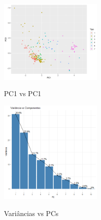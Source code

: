 \documentclass[conference]{IEEEtran}
\begin{document}
\begin{figure}[h]
\caption{PC1 vs PC1}
\centering %
\includegraphics[width=5cm]{images/pt4/pc1vspc1.png} %
\label{figura:histogramaal}
\end{figure}

\begin{figure}[h]
\caption{Variâncias vs PCs}
\centering %
\includegraphics[width=5cm]{images/pt4/varianciavspcs.png} %
\label{figura:histogramaal}
\end{figure}
\end{document}
